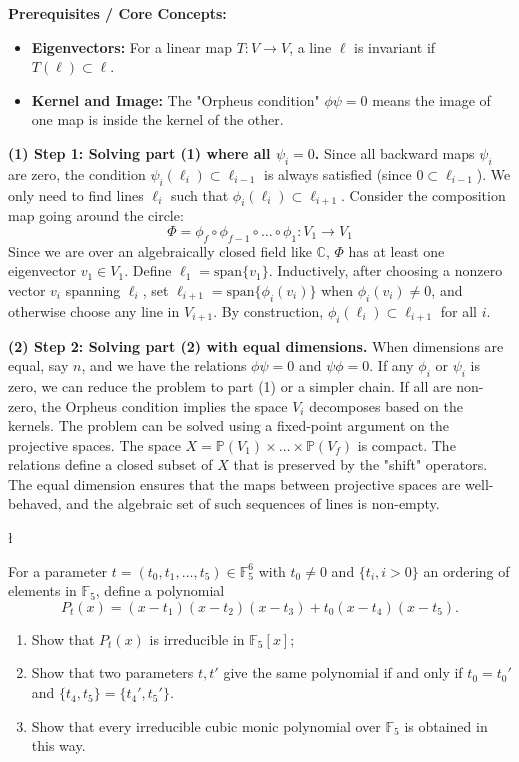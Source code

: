 \begin{solution}
\textbf{Prerequisites / Core Concepts:}
\begin{itemize}
    \item \textbf{Eigenvectors:} For a linear map $T: V \to V$, a line $\ell$ is invariant if $T(\ell) \subset \ell$.
    \item \textbf{Kernel and Image:} The "Orpheus condition" $\phi \psi = 0$ means the image of one map is inside the kernel of the other.
\end{itemize}

\textbf{(1) Step 1: Solving part (1) where all $\psi_i = 0$.}
Since all backward maps $\psi_i$ are zero, the condition $\psi_i(\ell_i) \subset \ell_{i-1}$ is always satisfied (since $0 \subset \ell_{i-1}$).
We only need to find lines $\ell_i$ such that $\phi_i(\ell_i) \subset \ell_{i+1}$.
Consider the composition map going around the circle:
\[ \Phi = \phi_f \circ \phi_{f-1} \circ \dots \circ \phi_1 : V_1 \to V_1 \]
Since we are over an algebraically closed field like $\mathbb{C}$, $\Phi$ has at least one eigenvector $v_1 \in V_1$.
Define $\ell_1 = \text{span}\{v_1\}$. Inductively, after choosing a nonzero vector $v_i$ spanning $\ell_i$, set $\ell_{i+1}=\text{span}\{\phi_i(v_i)\}$ when $\phi_i(v_i)\ne 0$, and otherwise choose any line in $V_{i+1}$.
By construction, $\phi_i(\ell_i) \subset \ell_{i+1}$ for all $i$.

\textbf{(2) Step 2: Solving part (2) with equal dimensions.}
When dimensions are equal, say $n$, and we have the relations $\phi \psi = 0$ and $\psi \phi = 0$.
If any $\phi_i$ or $\psi_i$ is zero, we can reduce the problem to part (1) or a simpler chain.
If all are non-zero, the Orpheus condition implies the space $V_i$ decomposes based on the kernels.
The problem can be solved using a fixed-point argument on the projective spaces. The space $X = \mathbb{P}(V_1) \times \dots \times \mathbb{P}(V_f)$ is compact. The relations define a closed subset of $X$ that is preserved by the "shift" operators.
The equal dimension ensures that the maps between projective spaces are well-behaved, and the algebraic set of such sequences of lines is non-empty.
\end{solution}

\begin{exercise}
\l\label{2013:3}

\label{algebra:2013:3}For a parameter $t = (t_0, t_1, \dots, t_5) \in \mathbb{F}_5^6$ with $t_0 \neq 0$ and $\{t_i, i > 0\}$ an ordering of elements in $\mathbb{F}_5$, define a polynomial
\[ P_t(x) = (x - t_1)(x - t_2)(x - t_3) + t_0(x - t_4)(x - t_5). \]
\begin{enumerate}
    \item Show that $P_t(x)$ is irreducible in $\mathbb{F}_5[x]$;
    \item Show that two parameters $t, t'$ give the same polynomial if and only if $t_0 = t_0'$ and $\{t_4, t_5\} = \{t_4', t_5'\}$.
    \item Show that every irreducible cubic monic polynomial over $\mathbb{F}_5$ is obtained in this way.
\end{enumerate}
\end{exercise}

